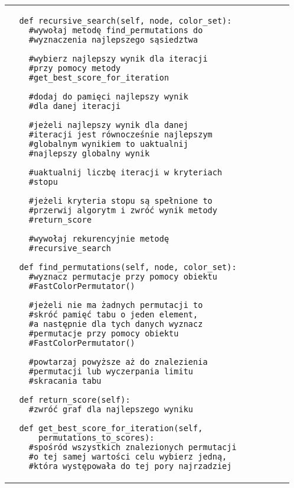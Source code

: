 \documentclass[a4paper,10pt]{article}
\begin{document}
\noindent\begin{table}[ht!]
            \begin{tabular}{lr}
                \begin{minipage}[t]{0.55\textwidth}
                    \begin{verbatim}
  def recursive_search(self, node, color_set):
    #wywołaj metodę find_permutations do
    #wyznaczenia najlepszego sąsiedztwa
        
    #wybierz najlepszy wynik dla iteracji
    #przy pomocy metody 
    #get_best_score_for_iteration

    #dodaj do pamięci najlepszy wynik
    #dla danej iteracji
    
    #jeżeli najlepszy wynik dla danej 
    #iteracji jest równocześnie najlepszym
    #globalnym wynikiem to uaktualnij 
    #najlepszy globalny wynik

    #uaktualnij liczbę iteracji w kryteriach
    #stopu
    
    #jeżeli kryteria stopu są spełnione to
    #przerwij algorytm i zwróć wynik metody
    #return_score

    #wywołaj rekurencyjnie metodę
    #recursive_search

  def find_permutations(self, node, color_set):        
    #wyznacz permutacje przy pomocy obiektu
    #FastColorPermutator()
        
    #jeżeli nie ma żadnych permutacji to
    #skróć pamięć tabu o jeden element,
    #a następnie dla tych danych wyznacz
    #permutacje przy pomocy obiektu
    #FastColorPermutator()
        
    #powtarzaj powyższe aż do znalezienia 
    #permutacji lub wyczerpania limitu
    #skracania tabu

  def return_score(self):
    #zwróć graf dla najlepszego wyniku

  def get_best_score_for_iteration(self, 
      permutations_to_scores):
    #spośród wszystkich znalezionych permutacji
    #o tej samej wartości celu wybierz jedną,
    #która występowała do tej pory najrzadziej
                    \end{verbatim}
                \end{minipage}
                
                &
        

\end{tabular}
\end{table}
\end{document}
